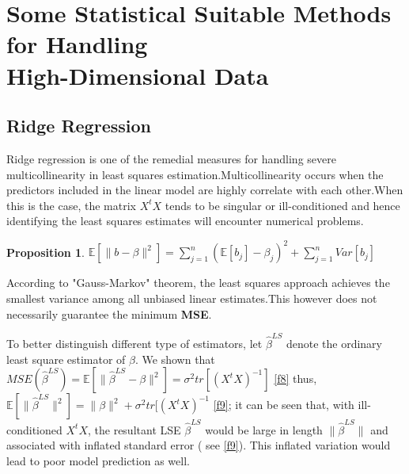 \documentclass[12pt]{report}
\newtheorem {proposition}{Proposition}[section]  %
\begin{document}
\section{Some Statistical Suitable Methods for Handling\\ High-Dimensional Data}
	\subsection{Ridge Regression}
\label{rre}
Ridge regression is one of the remedial measures for handling severe multicollinearity in least squares estimation.Multicollinearity occurs when the predictors included in the linear model are highly correlate with each other.When this is the case, the matrix $X^{t}X$ tends to be singular or ill-conditioned and hence identifying the least squares estimates will encounter numerical problems.
	\begin{proposition}
	$	\mathbb{E}[\parallel b-\beta \parallel^{2}]	=\sum_{j=1}^{n}	(\mathbb{E}[b_{j}]-\beta_{j})^{2} + \sum_{j=1}^{n}	Var[b_{j}]$
\end{proposition}
	According to "Gauss-Markov" theorem, the least squares approach achieves the smallest variance among all unbiased linear estimates.This however does not necessarily guarantee the minimum \textbf{MSE}.

To better distinguish different type of estimators, let $\hat{\beta}^{LS}$ denote the ordinary least square estimator of $\beta$. We shown that $MSE(\hat{\beta}^{LS})=\mathbb{E}[\parallel \hat{\beta}^{LS}-\beta \parallel^{2}]=\sigma^{2}tr[(X^{t}X)^{-1}]$ \eqref{f8} thus,
$\mathbb{E}[\parallel \hat{\beta}^{LS} \parallel^{2}]=\parallel \beta \parallel^{2} + \sigma^{2}tr[(X^{t}X)^{-1}$ \eqref{f9}; it can be seen that, with ill-conditioned $X^{t}X$, the resultant LSE $\hat{\beta}^{LS}$ would be large in length $\parallel\hat{\beta}^{LS}\parallel$ and associated with inflated standard error ( see \eqref{f9}). This inflated variation would lead to poor model prediction as well.
\end{document}
